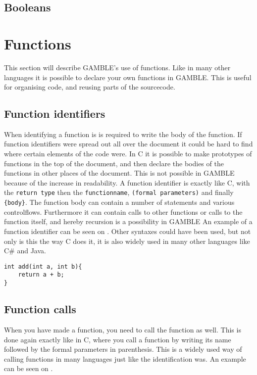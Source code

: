 \subsection{Booleans}

\section{Functions}
This section will describe GAMBLE's use of functions. 
Like in many other languages it is possible to declare your own functions in GAMBLE.
This is useful for organising code, and reusing parts of the sourcecode.

\subsection{Function identifiers}
When identifying a function is is required to write the body of the function.
If function identifiers were spread out all over the document it could be hard to find where certain elements of the code were.
In C it is possible to make prototypes of functions in the top of the document, and then declare the bodies of the functions in other places of the document. 
This is not possible in GAMBLE because of the increase in readability.
A function identifier is exactly like C, with the \texttt{return type} then the \texttt{functionname}, \texttt{(formal parameters)} and finally \texttt{\{body\}}.
The function body can contain a number of statements and various controlflows.
Furthermore it can contain calls to other functions or calls to the function itself, and hereby recursion is a possibility in GAMBLE
An example of a function identifier can be seen on .
Other syntaxes could have been used, but not only is this the way C does it, it is also widely used in many other languages like C\# and Java.

\begin{lstlisting}[label=functionID]                                                                           %LOL%
int add(int a, int b){
	return a + b;
}
\end{lstlisting}

\subsection{Function calls}
When you have made a function, you need to call the function as well.
This is done again exactly like in C, where you call a function by writing its name followed by the formal parameters in parenthesis.
This is a widely used way of calling functions in many languages just like the identification was.
An example can be seen on .

